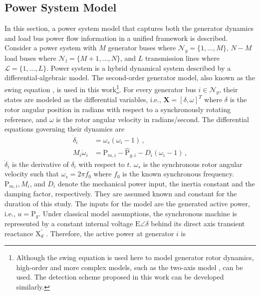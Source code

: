 \subsection{Power System Model}
\label{ch4:sec:power_model}
In this section, a power system model that captures both the generator dynamics and load bus power flow information in a unified framework is described. Consider a power system with $M$ generator buses where $\mathcal{N}_g = \{1, \dots, M\}$, $N-M$ load buses where $\mathcal{N}_l = \{M+1, \dots, N\}$, and $L$ transmission lines where $\mathcal{L} = \{1, \dots, L\}$. 
Power system is a hybrid dynamical system described by a differential-algebraic model. The second-order generator model, also known as the swing equation \cite{Kundur1994}, is used in this work\footnote{Although the swing equation is used here to model generator rotor dynamics, high-order and more complex models, such as the two-axis model \cite{sauer2017power}, can be used. The detection scheme proposed in this work can be developed similarly.}.
For every generator bus $i \in \mathcal{N}_g$, their states are modeled as the differential variables, i.e., $\boldsymbol{X}= [\delta, \omega]^T$ where $\delta$ is the rotor angular position in radians with respect to a synchronously rotating reference, and $\omega$ is the rotor angular velocity in radians/second. The differential equations governing their dynamics are
\begin{subequations}
\label{ch4:eqn:de_continuous}
\begin{align}
\dot{\delta}_{i} &=\omega_s\left(\omega_{i}-1\right) \,, \label{ch4:eqn:transition_function_delta}\\
M_i \dot{\omega}_{i} &=\text{P}_{m, i}-\hat{\text{P}}_{g, i}-D_i\left(\omega_{i}-1\right) \,, \label{ch4:eqn:transition_function_omega}
\end{align}
\end{subequations}
$\dot{\delta}_{i}$ is the derivative of $\delta_i$ with respect to $t$. $\omega_s$ is the synchronous rotor angular velocity such that $\omega_s= 2 \pi f_{0}$ where $f_0$ is the known synchronous frequency. $\text{P}_{m,i}, M_i$, and $D_i$ denote the mechanical power input, the inertia constant and the damping factor, respectively. They are assumed known and constant for the duration of this study. The inputs for the model are the generated active power, i.e., ${u}= \text{P}_{g}$. Under classical model assumptions, the synchronous machine is represented by a constant internal voltage $\text{E}\angle\delta$ behind its direct axis transient reactance $\text{X}_{{d}}^{\prime}$ \cite{Kundur1994}. Therefore, the active power at generator $i$ is
